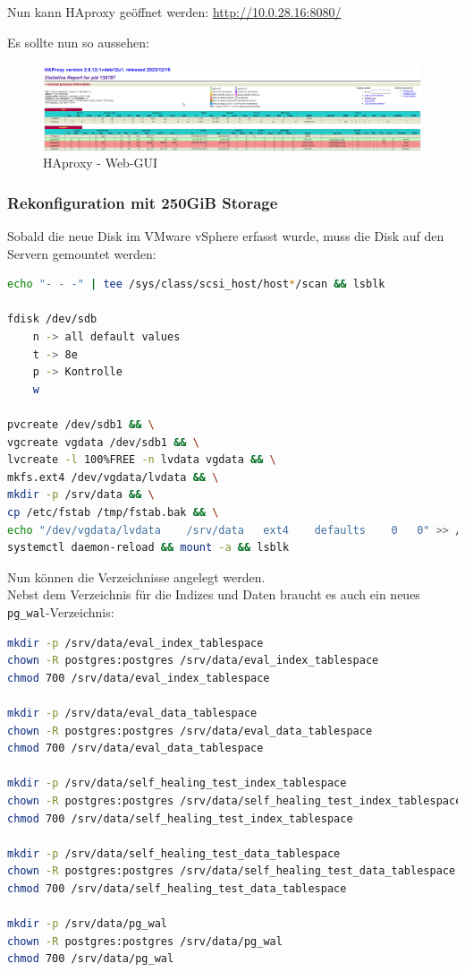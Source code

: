Nun kann HAproxy geöffnet werden:
\url{http://10.0.28.16:8080/}

Es sollte nun so aussehen:
\begin{figure}[H]
    \centering
    \includegraphics[width=0.8\linewidth]{source/implementation/evaluation/postgresql_ha_solutions/patroni/haproxy_webgui}
    \caption{HAproxy - Web-GUI}
    \label{fig:haproxy-webgui}
\end{figure}

\subsubsection{Rekonfiguration mit 250GiB Storage}
Sobald die neue Disk im \Gls{VMware vSphere} erfasst wurde, muss die Disk auf den Servern gemountet werden:
\lstset{style=gra_codestyle}
\begin{lstlisting}[language=bash, caption=Patroni - 250GiB Disk mount,captionpos=b,label={lst:patroni_250gib_disk_mount},breaklines=true]
echo "- - -" | tee /sys/class/scsi_host/host*/scan && lsblk

fdisk /dev/sdb
	n -> all default values
	t -> 8e
	p -> Kontrolle
	w

pvcreate /dev/sdb1 && \
vgcreate vgdata /dev/sdb1 && \
lvcreate -l 100%FREE -n lvdata vgdata && \
mkfs.ext4 /dev/vgdata/lvdata && \
mkdir -p /srv/data && \
cp /etc/fstab /tmp/fstab.bak && \
echo "/dev/vgdata/lvdata	/srv/data	ext4	defaults	0	0" >> /etc/fstab && \
systemctl daemon-reload && mount -a && lsblk
\end{lstlisting}

Nun können die Verzeichnisse angelegt werden.\\
Nebst dem Verzeichnis für die Indizes und Daten braucht es auch ein neues \texttt{pg\_wal}-Verzeichnis:
\lstset{style=gra_codestyle}
\begin{lstlisting}[language=bash, caption=Patroni - 250GiB Verzeichnisse,captionpos=b,label={lst:patroni_250gib_disk_directories},breaklines=true]
mkdir -p /srv/data/eval_index_tablespace
chown -R postgres:postgres /srv/data/eval_index_tablespace
chmod 700 /srv/data/eval_index_tablespace

mkdir -p /srv/data/eval_data_tablespace
chown -R postgres:postgres /srv/data/eval_data_tablespace
chmod 700 /srv/data/eval_data_tablespace

mkdir -p /srv/data/self_healing_test_index_tablespace
chown -R postgres:postgres /srv/data/self_healing_test_index_tablespace
chmod 700 /srv/data/self_healing_test_index_tablespace

mkdir -p /srv/data/self_healing_test_data_tablespace
chown -R postgres:postgres /srv/data/self_healing_test_data_tablespace
chmod 700 /srv/data/self_healing_test_data_tablespace

mkdir -p /srv/data/pg_wal
chown -R postgres:postgres /srv/data/pg_wal
chmod 700 /srv/data/pg_wal
\end{lstlisting}

